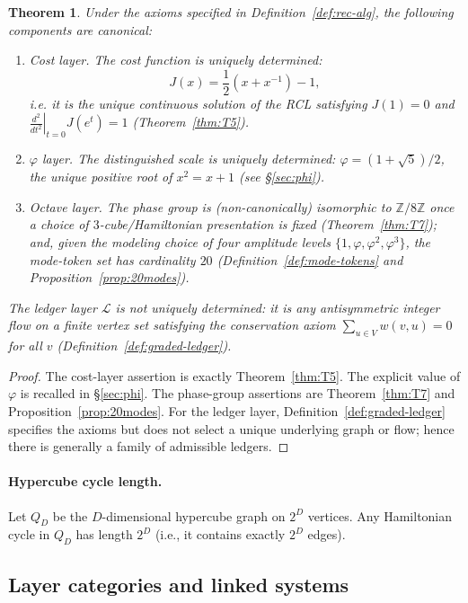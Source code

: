 \documentclass[11pt,reqno]{amsart}
\theoremstyle{plain}
\newtheorem{theorem}{Theorem}[section]
\theoremstyle{definition}
\theoremstyle{remark}
\newcommand{\phig}{\varphi}
\newcommand{\Jcost}{J}
\newcommand{\ZZ}{\mathbb{Z}}
\newcommand{\1}{\mathbf{1}}
\begin{document}
\begin{theorem}\label{thm:master}
Under the axioms specified in Definition~\ref{def:rec-alg}, the following
components are canonical:
\begin{enumerate}[nosep,label=\textup{(\roman*)}]
\item Cost layer. The cost function is uniquely determined: \[ \Jcost(x)=\frac12(x{+}x^{-1})-1, \] i.e. it is the unique continuous solution of the RCL satisfying $\Jcost(1)=0$ and $\left.\frac{d^2}{dt^2}\right|_{t=0}\Jcost(e^t)=1$ (Theorem~\ref{thm:T5}).
\item $\phig$ layer. The distinguished scale is uniquely determined: $\phig=(1{+}\sqrt5)/2$, the unique positive root of $x^2=x+1$ (see \S\ref{sec:phi}).
\item Octave layer. The phase group is (non-canonically) isomorphic to $\ZZ/8\ZZ$ once a choice of $3$-cube/Hamiltonian presentation is fixed (Theorem~\ref{thm:T7}); and, given the modeling choice of four amplitude levels $\{1,\phig,\phig^2,\phig^3\}$, the mode-token set has cardinality $20$ (Definition~\ref{def:mode-tokens} and Proposition~\ref{prop:20modes}).
\end{enumerate}
The ledger layer $\mathcal L$ is \emph{not} uniquely determined: it is any
antisymmetric integer flow on a finite vertex set satisfying the conservation
axiom $\sum_{u\in V}w(v,u)=0$ for all $v$ (Definition~\ref{def:graded-ledger}).
\end{theorem}

\begin{proof}
The cost-layer assertion is exactly Theorem~\ref{thm:T5}. The explicit value of $\phig$ is recalled in \S\ref{sec:phi}.
The phase-group assertions are Theorem~\ref{thm:T7} and Proposition~\ref{prop:20modes}.
For the ledger layer, Definition~\ref{def:graded-ledger} specifies the axioms but does
not select a unique underlying graph or flow; hence there is generally a family
of admissible ledgers.
\end{proof}

\paragraph{Hypercube cycle length.} Let $Q_D$ be the $D$-dimensional hypercube graph on $2^D$ vertices. Any Hamiltonian cycle in $Q_D$ has length $2^D$ (i.e., it contains exactly $2^D$ edges).


\subsection{Layer categories and linked systems}\label{subsec:layercats}
\end{document}
